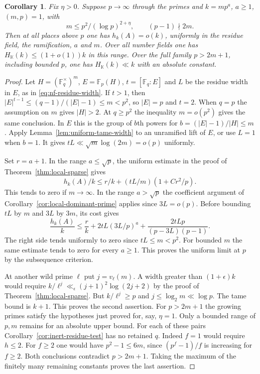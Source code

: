 \documentclass[11pt,letterpaper]{article}
\newtheorem{corollary}[corollary]{Corollary}
\theoremstyle{definition}
\numberwithin{equation}{section}
\begin{document}
\begin{corollary}\label{cor:wild-large-prime}
Fix $\eta>0$. Suppose $p\to\infty$ through the primes and
$k=mp^a$, $a\ge1$, $(m,p)=1$, with
\[
             m\le p^2/(\log p)^{2+\eta},
                         \qquad (p-1)\nmid 2m .
\]
Then at all places above $p$ one has $h_k(A)=o(k)$, uniformly in
the residue field, the ramification, $a$ and $m$. Over all number
fields one has $H_{\mathbb K}(k)\le(1+o(1))k$ in this range.
Over the full family $p>2m+1$, including bounded $p$, one has
$H_{\mathbb K}(k)\ll k$ with an absolute constant.
\end{corollary}
\begin{proof}
Let $H=(\mathbb F_q^\times)^m$, $E=\mathbb F_p(H)$, $t=[\mathbb F_q:E]$
and $L$ be the residue width in $E$, as in \eqref{eq:nf-residue-width}.
If $t>1$, then $|E|^{t-1}\le (q-1)/(|E|-1)\le m<p^2$,
so $|E|=p$ and $t=2$. When $q=p$ the assumption on $m$ gives
$|H|>2$. At $q\ge p^2$ the inequality $m=o(p^2)$ gives the same
conclusion. In $E$ this is the group of $b$th powers for
$b=(|E|-1)/|H|\le m$. Apply Lemma~\ref{lem:uniform-tame-width}
to an unramified lift of $E$, or use $L=1$ when $b=1$.
It gives $tL\ll\sqrt m\log(2m)=o(p)$ uniformly.

Set $r=a+1$. In the range $a\le\sqrt p$, the uniform estimate
in the proof of Theorem~\ref{thm:local-sparse} gives
\[
             h_k(A)/k\le r/k+(tL/m)(1+Cr^2/p).
\]
This tends to zero if $m\to\infty$. In the range $a>\sqrt p$
the coefficient argument of Corollary~\ref{cor:local-dominant-prime}
applies since $3L=o(p)$. Before bounding $tL$ by $m$ and $3L$ by
$3m$, its cost gives
\[
 \frac{h_k(A)}k\le\frac r k+
       2tL(3L/p)^a+\frac{2tL p}{(p-3L)(p-1)} .
\]
The right side tends uniformly to zero since $tL\le m<p^2$.
For bounded $m$ the same estimate tends to zero for every $a\ge1$.
This proves the uniform limit at $p$ by the subsequence criterion.

At another wild prime $\ell$ put $j=v_\ell(m)$. A width greater
than $(1+\epsilon)k$ would require
$k/\ell^j\ll_\epsilon(j+1)^2\log(2j+2)$ by the proof of
Theorem~\ref{thm:local-sparse}. But $k/\ell^j\ge p$ and
$j\le\log_2m\ll\log p$. The tame bound is $k+1$. This proves the
second assertion. For $p>2m+1$ the growing primes satisfy the
hypotheses just proved for, say, $\eta=1$. Only a bounded range of
$p,m$ remains for an absolute upper bound. For each of these pairs
Corollary~\ref{cor:inert-residue-test} has no retained $q$. Indeed
$f=1$ would require $h\le2$. For $f\ge2$ one would have
$p^2-1\le 6m$, since $(p^f-1)/f$ is increasing for $f\ge2$.
Both conclusions contradict $p>2m+1$. Taking the maximum of the
finitely many remaining constants proves the last assertion.
\end{proof}
\end{document}
